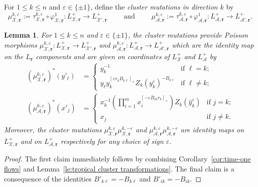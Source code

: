 \documentclass{amsart}
\newtheorem{lemma}[theorem]{Lemma}
\numberwithin{equation}{section}
\newcommand{\bfr}{{\boldsymbol{r}}}
\newcommand{\cA}{\mathcal{A}}
\newcommand{\cX}{\mathcal{X}}
\begin{document}
For $1\le k\le n$ and $\varepsilon\in\{\pm1\}$, define the \emph{cluster mutations in direction $k$} by 
\[\mu_{\cX,\bfr}^{k,\varepsilon}:=\tau_{\cX,\bfr}^{k,\varepsilon}\circ\varphi_{\cX,\bfr}^1:L^+_{\cX,\bfr}\to L^+_{\cX',\bfr}\qquad\text{ and }\qquad\mu_{\cA,\bfr}^{k,\varepsilon}:=\tau_{\cA,\bfr}^{k,\varepsilon}\circ\varphi_{\cA,\bfr}^1:L^+_{\cA,\bfr}\to L^+_{\cA',\bfr}.\]
\begin{lemma}
  \label{le:cluster mutation}
  For $1\le k\le n$ and $\varepsilon\in\{\pm1\}$, the cluster mutations provide Poisson morphisms $\mu_{\cX,\bfr}^{k,\varepsilon}:L^+_{\cX,\bfr}\to L^+_{\cX',\bfr}$ and $\mu_{\cA,\bfr}^{k,\varepsilon}:L^+_{\cA,\bfr}\to L^+_{\cA',\bfr}$ which are the identity map on the $L_\bfr$ components and are given on coordinates of $L^+_\cX$ and $L^+_\cA$ by
  \begin{align}
    \label{eq:X mutation}
    (\mu_{\cX,\bfr}^{k,\varepsilon})^*(y'_\ell)&=\begin{cases} y_k^{-1} & \text{if $\ell=k$;}\\ y_\ell y_k^{[\varepsilon r_kB_{k\ell}]_+} Z_k(y_k^\varepsilon)^{-B_{k\ell}} & \text{if $\ell\ne k$;}\end{cases}\\
    \label{eq:A mutation}
    (\mu_{\cA,\bfr}^{k,\varepsilon})^*(x'_j)&=\begin{cases} x_k^{-1}\left(\prod\limits_{i=1}^m x_i^{[-\varepsilon B_{ik}r_k]_+}\right)Z_k(\hat y_k^\varepsilon) & \text{if $j=k$;}\\ x_j & \text{if $j\ne k$.}\end{cases}
  \end{align}
  Moreover, the cluster mutations $\mu_{\cX,\bfr}^{k,\varepsilon}\mu_{\cX,\bfr}^{k,-\varepsilon}$ and $\mu_{\cA,\bfr}^{k,\varepsilon}\mu_{\cA,\bfr}^{k,-\varepsilon}$ are identity maps on $L^+_{\cX,\bfr}$ and on $L^+_{\cA,\bfr}$ respectively for any choice of sign $\varepsilon$.
\end{lemma}
\begin{proof}
  The first claim immediately follows by combining Corollary~\ref{cor:time-one flows} and Lemma~\ref{le:tropical cluster transformations}.
  The final claim is a consequence of the identities $B'_{k\ell}=-B_{k\ell}$ and $B'_{ik}=-B_{ik}$.
\end{proof}
\end{document}

